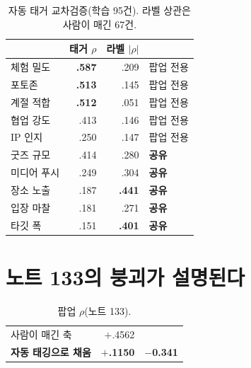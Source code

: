 \documentclass[10pt]{article}
\begin{document}
\begin{table}[t]
\centering\tsize
\caption{자동 태거 교차검증(학습 95건). 라벨 상관은 사람이 매긴 67건.}
\begin{tabular}{lrrl}
\toprule
& 태거 $\rho$ & 라벨 $|\rho|$ & \\
\midrule
체험 밀도 & \textbf{.587} & .209 & 팝업 전용 \\
포토존 & \textbf{.513} & .145 & 팝업 전용 \\
계절 적합 & \textbf{.512} & .051 & 팝업 전용 \\
협업 강도 & .413 & .146 & 팝업 전용 \\
IP 인지 & .250 & .147 & 팝업 전용 \\
\midrule
굿즈 규모 & .414 & .280 & \textbf{공유} \\
미디어 푸시 & .249 & .304 & \textbf{공유} \\
장소 노출 & .187 & \textbf{.441} & \textbf{공유} \\
입장 마찰 & .181 & .271 & \textbf{공유} \\
타깃 폭 & .151 & \textbf{.401} & \textbf{공유} \\
\bottomrule
\end{tabular}
\end{table}



\section{노트 133의 붕괴가 설명된다}

\begin{table}[t]
\centering\tsize
\caption{팝업 $\rho$(노트 133).}
\begin{tabular}{lrl}
\toprule
사람이 매긴 축 & $+$.4562 & \\
\textbf{자동 태깅으로 채움} & \textbf{$+$.1150} & \textbf{$-$0.341} \\
\bottomrule
\end{tabular}
\end{table}
\end{document}
